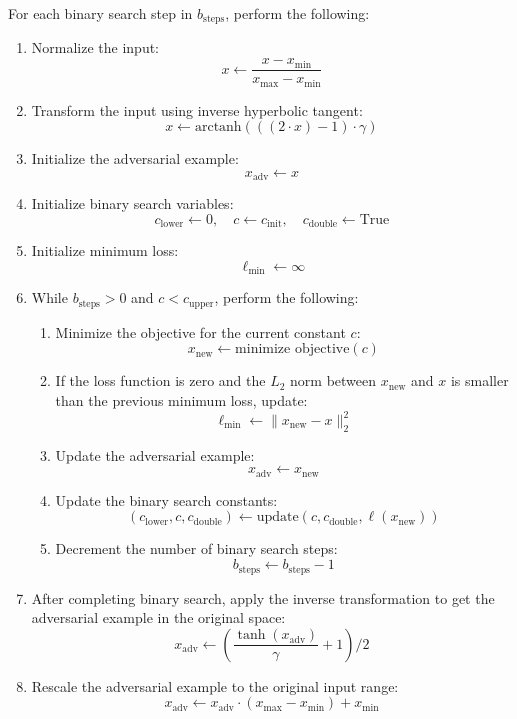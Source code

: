 For each binary search step in $b_{\text{steps}}$, perform the following:
    \begin{enumerate}
        \item Normalize the input:
        \[
        x \leftarrow \frac{x - x_{\text{min}}}{x_{\text{max}} - x_{\text{min}}}
        \]
        \item Transform the input using inverse hyperbolic tangent:
        \[
        x \leftarrow \text{arctanh}\left( ((2 \cdot x) - 1) \cdot \gamma \right)
        \]
        \item Initialize the adversarial example:
        \[
        x_{\text{adv}} \leftarrow x
        \]
        \item Initialize binary search variables:
        \[
        c_{\text{lower}} \leftarrow 0, \quad c \leftarrow c_{\text{init}}, \quad c_{\text{double}} \leftarrow \text{True}
        \]
        \item Initialize minimum loss:
        \[
        \ell_{\text{min}} \leftarrow \infty
        \]
        \item While $b_{\text{steps}} > 0$ and $c < c_{\text{upper}}$, perform the following:
        \begin{enumerate}
            \item Minimize the objective for the current constant $c$:
            \[
            x_{\text{new}} \leftarrow \text{minimize objective}(c)
            \]
            \item If the loss function is zero and the $L_2$ norm between $x_{\text{new}}$ and $x$ is smaller than the previous minimum loss, update:
            \[
            \ell_{\text{min}} \leftarrow \|x_{\text{new}} - x\|_2^2
            \]
            \item Update the adversarial example:
            \[
            x_{\text{adv}} \leftarrow x_{\text{new}}
            \]
            \item Update the binary search constants:
            \[
            (c_{\text{lower}}, c, c_{\text{double}}) \leftarrow \text{update}(c, c_{\text{double}}, \ell(x_{\text{new}}))
            \]
            \item Decrement the number of binary search steps:
            \[
            b_{\text{steps}} \leftarrow b_{\text{steps}} - 1
            \]
        \end{enumerate}
        \item After completing binary search, apply the inverse transformation to get the adversarial example in the original space:
        \[
        x_{\text{adv}} \leftarrow \left( \frac{\tanh(x_{\text{adv}})}{\gamma} + 1 \right) / 2
        \]
        \item Rescale the adversarial example to the original input range:
        \[
        x_{\text{adv}} \leftarrow x_{\text{adv}} \cdot (x_{\text{max}} - x_{\text{min}}) + x_{\text{min}}
        \]
    \end{enumerate}

